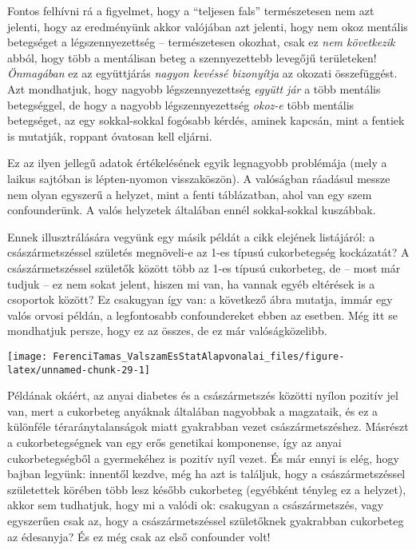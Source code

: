\documentclass[magyar,]{book}
\begin{document}
Fontos felhívni rá a figyelmet, hogy a \enquote{teljesen fals} természetesen nem azt jelenti, hogy az eredményünk akkor valójában azt jelenti, hogy nem okoz mentális betegséget a légszennyezettség -- természetesen okozhat, csak ez \emph{nem következik} abból, hogy több a mentálisan beteg a szennyezettebb levegőjű területeken! \emph{Önmagában} ez az együttjárás \emph{nagyon kevéssé bizonyítja} az okozati összefüggést. Azt mondhatjuk, hogy nagyobb légszennyezettség \emph{együtt jár} a több mentális betegséggel, de hogy a nagyobb légszennyezettség \emph{okoz-e} több mentális betegséget, az egy sokkal-sokkal fogósabb kérdés, aminek kapcsán, mint a fentiek is mutatják, roppant óvatosan kell eljárni.

Ez az ilyen jellegű adatok értékelésének egyik legnagyobb problémája (mely a laikus sajtóban is lépten-nyomon visszaköszön). A valóságban ráadásul messze nem olyan egyszerű a helyzet, mint a fenti táblázatban, ahol van egy szem confounderünk. A valós helyzetek általában ennél sokkal-sokkal kuszábbak.

Ennek illusztrálására vegyünk egy másik példát a cikk elejének listájáról: a császármetszéssel születés megnöveli-e az 1-es típusú cukorbetegség kockázatát? A császármetszéssel születők között több az 1-es típusú cukorbeteg, de -- most már tudjuk -- ez nem sokat jelent, hiszen mi van, ha vannak egyéb eltérések is a csoportok között? Ez csakugyan így van: a következő ábra mutatja, immár egy valós orvosi példán, a legfontosabb confoundereket ebben az esetben. Még itt se mondhatjuk persze, hogy ez az összes, de ez már valóságközelibb.

\begin{center}\texttt{[image: FerenciTamas\_ValszamEsStatAlapvonalai\_files/figure-latex/unnamed-chunk-29-1]} \end{center}

Példának okáért, az anyai diabetes és a császármetszés közötti nyílon pozitív jel van, mert a cukorbeteg anyáknak általában nagyobbak a magzataik, és ez a különféle téraránytalanságok miatt gyakrabban vezet császármetszéshez. Másrészt a cukorbetegségnek van egy erős genetikai komponense, így az anyai cukorbetegségből a gyermekéhez is pozitív nyíl vezet. És már ennyi is elég, hogy bajban legyünk: innentől kezdve, még ha azt is találjuk, hogy a császármetszéssel születettek körében több lesz később cukorbeteg (egyébként tényleg ez a helyzet), akkor sem tudhatjuk, hogy mi a valódi ok: csakugyan a császármetszés, vagy egyszerűen csak az, hogy a császármetszéssel születőknek gyakrabban cukorbeteg az édesanyja? És ez még csak az első confounder volt!
\end{document}
